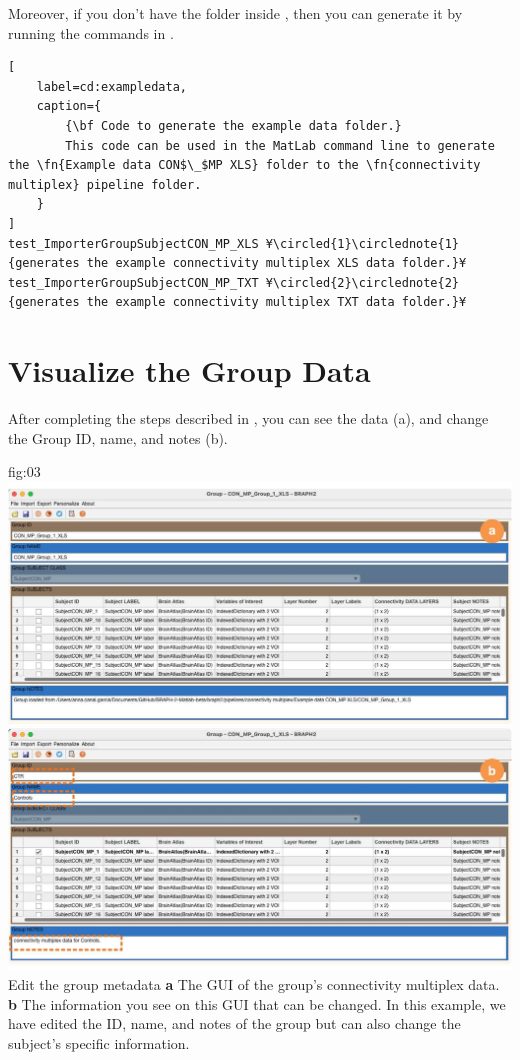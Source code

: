 \documentclass[justified]{tufte-handout}
\begin{document}
Moreover, if you don't have the  folder inside , then you can generate it by running the commands in .

\begin{lstlisting}[
	label=cd:exampledata,
	caption={
		{\bf Code to generate the example data folder.}
		This code can be used in the MatLab command line to generate the \fn{Example data CON$\_$MP XLS} folder to the \fn{connectivity multiplex} pipeline folder.
	}
]
test_ImporterGroupSubjectCON_MP_XLS ¥\circled{1}\circlednote{1}{generates the example connectivity multiplex XLS data folder.}¥
test_ImporterGroupSubjectCON_MP_TXT ¥\circled{2}\circlednote{2}{generates the example connectivity multiplex TXT data folder.}¥
\end{lstlisting}

\section{Visualize the Group Data}

After completing the steps described in , you can see the data (a), and change the Group ID, name, and notes (b). 

	{fig:03}
	{
	\includegraphics{fig03.jpg}
	}
	{Edit the group metadata}
	{ 
	{\bf a} The GUI of the group's connectivity multiplex data. 
	{\bf b} The information you see on this GUI that can be changed. In this example, we have edited the ID, name, and notes of the group but can also change the subject's specific information.
	}
\end{document}
